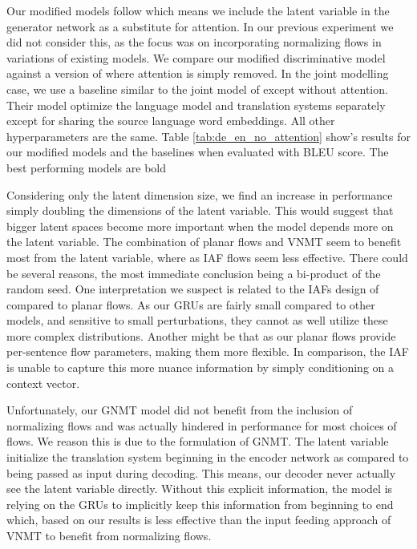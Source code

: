 Our modified models follow \citet{bahdanau2014NMTBYJoint} which means we include the latent variable in the generator network as a substitute for attention. In our previous experiment we did not consider this, as the focus was on incorporating normalizing flows in variations of existing models. We compare our modified discriminative model against a version of \citet{bahdanau2014NMTBYJoint} where attention is simply removed. In the joint modelling case, we use a baseline similar to the joint model of \citet{eikema2018AEVNMT} except without attention. Their model optimize the language model and translation systems separately except for sharing the source language word embeddings. All other hyperparameters are the same. Table \ref{tab:de_en_no_attention} show's results for our modified models and the baselines when evaluated with BLEU score. The best performing models are bold

Considering only the latent dimension size, we find an increase in performance simply doubling the dimensions of the latent variable. This would suggest that bigger latent spaces become more important when the model depends more on the latent variable. The combination of planar flows and \ac{VNMT} seem to benefit most from the latent variable, where as \ac{IAF} flows seem less effective. There could be several reasons, the most immediate conclusion being a bi-product of the random seed. One interpretation we suspect is related to the \ac{IAF}s design of compared to planar flows. As our \ac{GRU}s are fairly small compared to other models, and sensitive to small perturbations, they cannot as well utilize these more complex distributions. Another might be that as our planar flows provide per-sentence flow parameters, making them more flexible. In comparison, the \ac{IAF} is unable to capture this more nuance information by simply conditioning on a context vector. 

 Unfortunately, our \ac{GNMT} model did not benefit from the inclusion of normalizing flows and was actually hindered in performance for most choices of flows. We reason this is due to the formulation of \ac{GNMT}. The latent variable initialize the translation system beginning in the encoder network as compared to being passed as input during decoding. This means, our decoder never actually see the latent variable directly. Without this explicit information, the model is relying on the \ac{GRU}s to implicitly keep this information from beginning to end which, based on our results is less effective than the input feeding approach of \ac{VNMT} to benefit from normalizing flows. 


